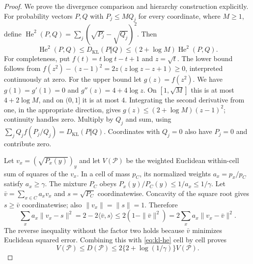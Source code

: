 \documentclass[11pt]{article}
\theoremstyle{remark}\newtheorem{remark}[theorem]{Remark}
\newcommand{\KL}{D_{\mathrm{KL}}}
\newcommand{\cP}{\mathcal P}
\DeclareMathOperator{\He}{He}
\begin{document}
\begin{proof}
We prove the divergence comparison and hierarchy construction explicitly.
For probability vectors $P,Q$ with $P_j\le M Q_j$ for every coordinate,
where $M\ge1$, define
$\He^2(P,Q)=\sum_j(\sqrt{P_j}-\sqrt{Q_j})^2$. Then
\begin{equation}
 \He^2(P,Q)\le\KL(P\Vert Q)
       \le(2+\log M)\He^2(P,Q).
 \label{eq:kl-he}
\end{equation}
For completeness, put $f(t)=t\log t-t+1$ and $z=\sqrt t$.
The lower bound follows from
$f(z^2)-(z-1)^2=2z(z\log z-z+1)\ge0$, interpreted continuously at zero.
For the upper bound let $g(z)=f(z^2)$. We have $g(1)=g'(1)=0$ and
$g''(z)=4+4\log z$. On $[1,\sqrt M]$ this is at most
$4+2\log M$, and on $(0,1]$ it is at most $4$. Integrating the second
 derivative from one, in the appropriate direction, gives
$g(z)\le(2+\log M)(z-1)^2$; continuity handles zero.
Multiply by $Q_j$ and sum, using $\sum_jQ_j f(P_j/Q_j)=\KL(P\Vert Q)$.
Coordinates with $Q_j=0$ also have $P_j=0$ and contribute zero.

Let $v_x=(\sqrt{P_x(y)})_y$ and let $V(\cP)$ be the weighted Euclidean
within-cell sum of squares of the $v_x$. In a cell of mass $p_C$, its
normalized weights $a_x=p_x/p_C$ satisfy $a_x\ge\gamma$.
The mixture $P_C$ obeys $P_x(y)/P_C(y)\le1/a_x\le1/\gamma$.
Let $\bar v=\sum_{x\in C}a_xv_x$ and $s=\sqrt{P_C}$ coordinatewise.
Concavity of the square root gives $s\ge\bar v$ coordinatewise; also
$\|v_x\|=\|s\|=1$. Therefore
\[
 \sum_xa_x\|v_x-s\|^2
  =2-2\langle\bar v,s\rangle
  \le2(1-\|\bar v\|^2)
  =2\sum_xa_x\|v_x-\bar v\|^2.
\]
The reverse inequality without the factor two holds because $\bar v$
minimizes Euclidean squared error. Combining this with \eqref{eq:kl-he}
cell by cell proves
\begin{equation}
 V(\cP)\le D(\cP)\le2\{2+\log(1/\gamma)\}V(\cP).
 \label{eq:DV}
\end{equation}


\end{proof}
\end{document}

